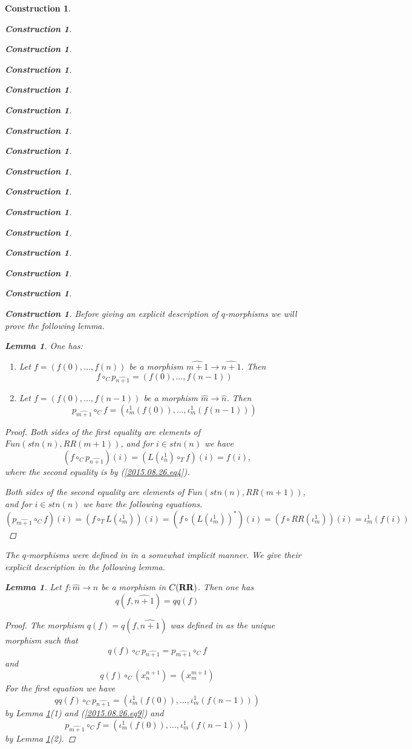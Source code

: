 \documentclass[onecolumn,12pt]{amsart}
\newtheorem{lemma}[proposition]{Lemma}
\numberwithin{proposition}{subsection}
\newtheorem{construction}[proposition]{Construction}
\newcommand{\sr}{\rightarrow}
\newcommand{\wh}{\widehat}
\newcommand{\mbind}[1]{{#1^*}}
\newcommand{\RR}{{\bf RR}}
\begin{document}
\begin{construction}
\begin{construction}
\begin{construction}
\begin{construction}
\begin{construction}
\begin{construction}
\begin{construction}
\begin{construction}
\begin{construction}
\begin{construction}
\begin{construction}
\begin{construction}
\begin{construction}
\begin{construction}
\begin{construction}
\begin{construction}
Before giving an explicit description of $q$-morphisms we will prove the
following lemma.
%
\begin{lemma}
\label{2015.07.24.l1}
One has:
%
\begin{enumerate}
\item Let $f=(f(0),\dots,f(n))$ be a morphism $\wh{m+1}\sr\wh{n+1}$. Then 
%
$$f\circ_C p_{\wh{n+1}}=(f(0),\dots,f(n-1))$$
%
\item Let $f=(f(0),\dots,f(n-1))$ be a morphism $\wh{m}\sr \wh{n}$. Then 
%
$$p_{\wh{m+1}}\circ_C f=(\iota_m^1(f(0)),\dots,\iota_m^1(f(n-1)))$$
%
\end{enumerate}
\end{lemma}
%
\begin{proof}
Both sides of the first equality are elements of $Fun(stn(n), RR(m+1))$, and for $i\in stn(n)$ we have
%
$$(f\circ_C p_{\wh{n+1}})(i)=(L(\iota_{n}^1)\circ_T f)(i)=f(i),$$
%
where the second equality is by (\ref{2015.08.26.eq4}). 

Both sides of the second equality are elements of $Fun(stn(n), RR(m+1))$,
and for $i\in stn(n)$ we have the following equations.
%
$$(p_{\wh{m+1}}\circ_C f)(i)=(f\circ_T L(\iota_{m}^1))(i)=(f\circ \mbind{(L(\iota_{m}^1))})(i)=(f\circ RR(\iota_{m}^1))(i)=\iota_{m}^1(f(i))$$
%
\end{proof}
%
The $q$-morphisms were defined in \cite{LandC} in a somewhat implicit
manner. We give their explicit description in the following lemma.
%
\begin{lemma}
\label{2016.01.15.l3}
Let $f:\wh{m}\sr \wh{n}$ be a morphism in $C(\RR)$. Then one has
%
$$q(f,\wh{n+1})=qq(f)$$
%
\end{lemma}
%
\begin{proof}
The morphism $q(f)=q(f,\wh{n+1})$ was defined in \cite{LandC} as the unique
morphism such that
%
$$q(f)\circ_C p_{\wh{n+1}}=p_{\wh{m+1}}\circ_C f$$
%
and
%
$$q(f)\circ_C (x_n^{n+1})=(x_m^{m+1})$$
%
For the first equation we have
%
$$qq(f)\circ_C p_{\wh{n+1}}=(\iota_m^1(f(0)),\dots,\iota_m^1(f(n-1)))$$
%
by Lemma \ref{2015.07.24.l1}(1) and (\ref{2015.08.26.eq9}) and
%
$$p_{\wh{m+1}}\circ_C f = (\iota_m^1(f(0)),\dots,\iota_m^1(f(n-1)))$$
%
by Lemma \ref{2015.07.24.l1}(2).


\end{proof}
\end{construction}
\end{construction}
\end{construction}
\end{construction}
\end{construction}
\end{construction}
\end{construction}
\end{construction}
\end{construction}
\end{construction}
\end{construction}
\end{construction}
\end{construction}
\end{construction}
\end{construction}
\end{construction}
\end{document}
